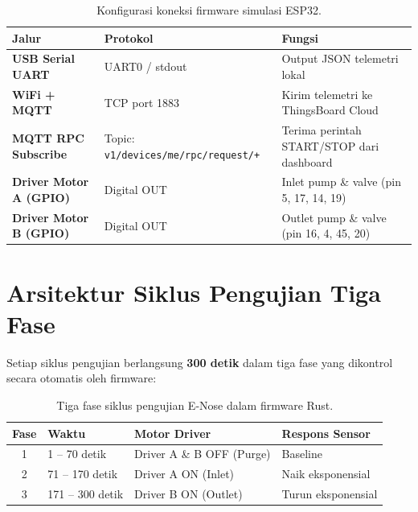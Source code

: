 \documentclass[12pt,a4paper]{report}
\begin{document}
\begin{table}[H]
  \centering
  \caption{Konfigurasi koneksi firmware simulasi ESP32.}
  \label{tab:koneksi_fw}
  \begin{tabularx}{\textwidth}{>{\bfseries}p{3.6cm} p{4.6cm} X}
    \toprule
    \textbf{Jalur} & \textbf{Protokol} & \textbf{Fungsi} \\
    \midrule
    USB Serial UART       & UART0 / stdout                                                           & Output JSON telemetri lokal \\
    WiFi + MQTT           & TCP port 1883                                                            & Kirim telemetri ke ThingsBoard Cloud \\
    MQTT RPC Subscribe    & Topic: \newline \texttt{v1/devices/me/}\allowbreak\texttt{rpc/request/+} & Terima perintah START/STOP dari dashboard \\
    Driver Motor A (GPIO) & Digital OUT                                                              & Inlet pump \& valve (pin 5, 17, 14, 19) \\
    Driver Motor B (GPIO) & Digital OUT                                                              & Outlet pump \& valve (pin 16, 4, 45, 20) \\
    \bottomrule
  \end{tabularx}
\end{table}

\section{Arsitektur Siklus Pengujian Tiga Fase}

Setiap siklus pengujian berlangsung \textbf{300 detik} dalam tiga fase yang
dikontrol secara otomatis oleh firmware:

\begin{table}[H]
  \centering
  \caption{Tiga fase siklus pengujian E-Nose dalam firmware Rust.}
  \label{tab:fases}
  \begin{tabular}{clll}
    \toprule
    \textbf{Fase} & \textbf{Waktu} & \textbf{Motor Driver} & \textbf{Respons Sensor} \\
    \midrule
    1 & 1 -- 70 detik    & Driver A \& B OFF (Purge) & Baseline \\
    2 & 71 -- 170 detik  & Driver A ON (Inlet)        & Naik eksponensial \\
    3 & 171 -- 300 detik & Driver B ON (Outlet)       & Turun eksponensial \\
    \bottomrule
  \end{tabular}
\end{table}
\end{document}
